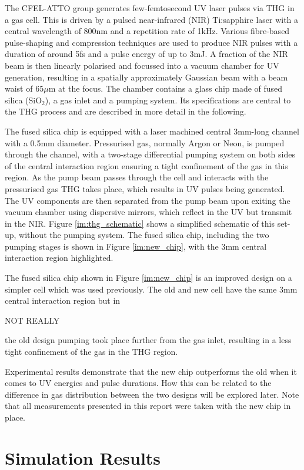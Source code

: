 \documentclass[a4paper]{jpconf}
\begin{document}
The CFEL-ATTO group generates few-femtosecond UV laser pulses via THG in a gas cell. This is driven by a pulsed near-infrared (NIR) Ti:sapphire laser with a central wavelength of 800nm and a repetition rate of 1kHz. Various fibre-based pulse-shaping and compression techniques are used to produce NIR pulses with a duration of around 5fs and a pulse energy of up to 3mJ. A fraction of the NIR beam is then linearly polarised and focussed into a vacuum chamber for UV generation, resulting in a spatially approximately Gaussian beam with a beam waist of 65$\mu$m at the focus. The chamber contains a glass chip made of fused silica (SiO$_2$), a gas inlet and a pumping system. Its specifications are central to the THG process and are described in more detail in the following. \par 
The fused silica chip is equipped with a laser machined central 3mm-long channel with a 0.5mm diameter. Pressurised gas, normally Argon or Neon, is pumped through the channel, with a two-stage differential pumping system on both sides of the central interaction region ensuring a tight confinement of the gas in this region. As the pump beam passes through the cell and interacts with the pressurised gas THG takes place, which results in UV pulses being generated. The UV components are then separated from the pump beam upon exiting the vacuum chamber using dispersive mirrors, which reflect in the UV but transmit in the NIR. Figure \ref{im:thg_schematic} shows a simplified schematic of this set-up, without the pumping system. The fused silica chip, including the two pumping stages is shown in Figure \ref{im:new_chip}, with the 3mm central interaction region highlighted. \par 
The fused silica chip shown in Figure \ref{im:new_chip} is an improved design on a simpler  cell which was used previously. The old and new cell have the same 3mm central interaction region but in

NOT REALLY 

 the old design pumping took place further from the gas inlet, resulting in a less tight confinement of the gas in the THG region. 
 
 
 Experimental results demonstrate that the new chip outperforms the old when it comes to UV energies and pulse durations. How this can be related to the difference in gas distribution between the two designs will be explored later. Note that all measurements presented in this report were taken with the new chip in place. 


\section{Simulation Results}
\end{document}
